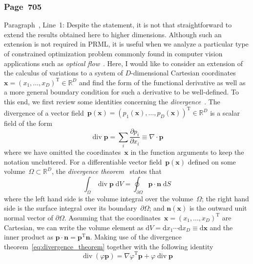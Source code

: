 \documentclass[12pt,a4paper]{article}
\newcommand{\erratum}[1]{%
\subsubsection*{#1}
\addcontentsline{toc}{subsection}{#1}}
\begin{document}
\erratum{Page~705}
Paragraph~, Line~1:
Despite the statement,
it is not that straightforward to extend the results obtained here to higher dimensions.
Although such an extension is not required in PRML, it is useful when we analyze
a particular type of constrained optimization problem commonly found in
computer vision applications such as \emph{optical flow}~\citep{HornSchunck:OpticalFlow}.
Here, I would like to consider an extension of the calculus of variations to
a system of $D$-dimensional Cartesian coordinates~$\mathbf{x} =
\left( x_1, \dots, x_D \right)^{\operatorname{T}} \in \mathbb{R}^{D}$
and find the form of the functional derivative as well as a more general boundary condition
for such a derivative to be well-defined.
To this end, we first review some identities concerning
the \emph{divergence}~\citep{Feynman:FeynmanLectures2}.
The divergence of a vector field~$\mathbf{p}(\mathbf{x}) =
\left( p_1(\mathbf{x}), \dots, p_D(\mathbf{x}) \right)^{\operatorname{T}} \in \mathbb{R}^{D}$
is a scalar field of the form
\begin{equation}
\operatorname{div} \mathbf{p} = \sum_{i} \frac{\partial p_i}{\partial x_i} \equiv
\nabla \cdot \mathbf{p}
\end{equation}
where we have omitted the coordinates~$\mathbf{x}$ in the function arguments
to keep the notation uncluttered.
For a differentiable vector field~$\mathbf{p}(\mathbf{x})$ defined on
some volume~$\Omega \subset \mathbb{R}^D$,
the \emph{divergence theorem}~\citep{Feynman:FeynmanLectures2} states that
\begin{equation}
\int_{\Omega} \operatorname{div} \mathbf{p} \; \mathrm{d}V =
\oint_{\partial\Omega} \mathbf{p} \cdot \mathbf{n} \; \mathrm{d}S
\label{eq:divergence_theorem}
\end{equation}
where the left hand side is the volume integral over the volume~$\Omega$;
the right hand side is the surface integral over its boundary~$\partial\Omega$; and
$\mathbf{n}(\mathbf{x})$ is the outward unit normal vector of $\partial\Omega$.
Assuming that the coordinates~$\mathbf{x} = \left( x_1, \dots, x_D \right)^{\operatorname{T}}$ are
Cartesian, we can write the volume element as
$\mathrm{d}V = \mathrm{d}x_1 \cdots \mathrm{d}x_D \equiv \mathrm{d}\mathbf{x}$ and
the inner product as $\mathbf{p} \cdot \mathbf{n} = \mathbf{p}^{\operatorname{T}} \mathbf{n}$.
Making use of the divergence theorem~\eqref{eq:divergence_theorem}
together with the following identity
\begin{equation}
\operatorname{div}\left(\varphi\mathbf{p}\right) =
{\nabla\varphi}^{\operatorname{T}} \mathbf{p} + \varphi \operatorname{div}\mathbf{p}
\end{equation}
\end{document}
